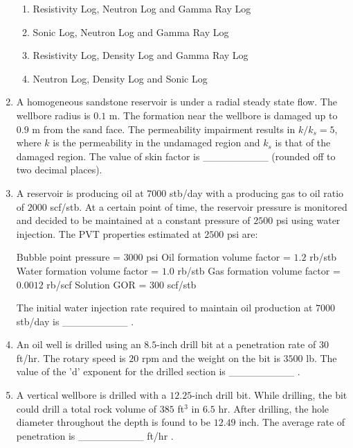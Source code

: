 \documentclass[journal,12pt,onecolumn]{IEEEtran}
\theoremstyle{remark}
\begin{document}
\begin{enumerate}
\hfill{}

\begin{enumerate}
\item Resistivity Log, Neutron Log and Gamma Ray Log
\item Sonic Log, Neutron Log and Gamma Ray Log
\item Resistivity Log, Density Log and Gamma Ray Log
\item Neutron Log, Density Log and Sonic Log
\end{enumerate}

\item A homogeneous sandstone reservoir is under a radial steady state flow. The wellbore radius is $0.1$ m. The formation near the wellbore is damaged up to $0.9$ m from the sand face. The permeability impairment results in $k/k_s = 5$, where $k$ is the permeability in the undamaged region and $k_s$ is that of the damaged region. The value of skin factor is \_\_\_\_\_\_\_\_\_ (rounded off to two decimal places).

\hfill{}

\item A reservoir is producing oil at $7000$ stb/day with a producing gas to oil ratio  of $2000$ scf/stb. At a certain point of time, the reservoir pressure is monitored and decided to be maintained at a constant pressure of $2500$ psi using water injection. The PVT properties estimated at $2500$ psi are:  

Bubble point pressure = $3000$ psi  
Oil formation volume factor = $1.2$ rb/stb  
Water formation volume factor = $1.0$ rb/stb  
Gas formation volume factor = $0.0012$ rb/scf  
Solution GOR = $300$ scf/stb  

The initial water injection rate  required to maintain oil production at $7000$ stb/day is \_\_\_\_\_\_\_\_\_ .

\hfill{}

\item An oil well is drilled using an $8.5$-inch drill bit at a penetration rate of $30$ ft/hr. The rotary speed is $20$ rpm and the weight on the bit is $3500$ lb. The value of the 'd' exponent for the drilled section is \_\_\_\_\_\_\_\_\_ .

\hfill{}

\item A vertical wellbore is drilled with a $12.25$-inch drill bit. While drilling, the bit could drill a total rock volume of $385$ ft$^3$ in $6.5$ hr. After drilling, the hole diameter throughout the depth is found to be $12.49$ inch. The average rate of penetration is \_\_\_\_\_\_\_\_\_ ft/hr .


\end{enumerate}
\end{document}
